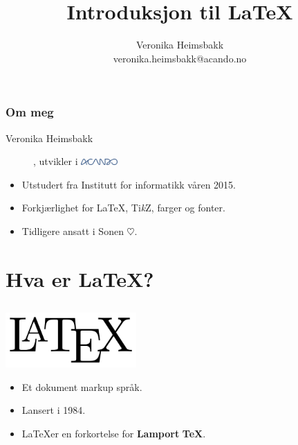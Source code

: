 \documentclass[10pt]{beamer}
\title{Introduksjon til \LaTeX{}}
\author{Veronika Heimsbakk\\veronika.heimsbakk@acando.no}
\date{}
\begin{document}
\begin{frame}\frametitle{}
\maketitle
\end{frame}

\begin{frame}\frametitle{Om meg}
\begin{description}
\item[Veronika Heimsbakk], utvikler i \includegraphics[width=1.4cm]{img/acandologo.png}
\end{description}

\begin{itemize}
	\item
	Utstudert fra Institutt for informatikk våren 2015.
	\item
	Forkjærlighet for \LaTeX{}, Ti\textit{k}Z, farger og fonter.
	\item
	Tidligere ansatt i Sonen $\heartsuit$.
\end{itemize}
\end{frame}

\section{Hva er \LaTeX{}?}
\subsection{}
\begin{frame}\frametitle{}

\begin{center}
\includegraphics[width=5cm]{img/latexlogo.png}
\end{center}

\begin{itemize}
	\item
	Et dokument markup språk.
	\item
	Lansert i 1984.
	\item
	\LaTeX er en forkortelse for \textbf{Lamport} \textbf{\TeX}.
\end{itemize}
\end{frame}
\end{document}
